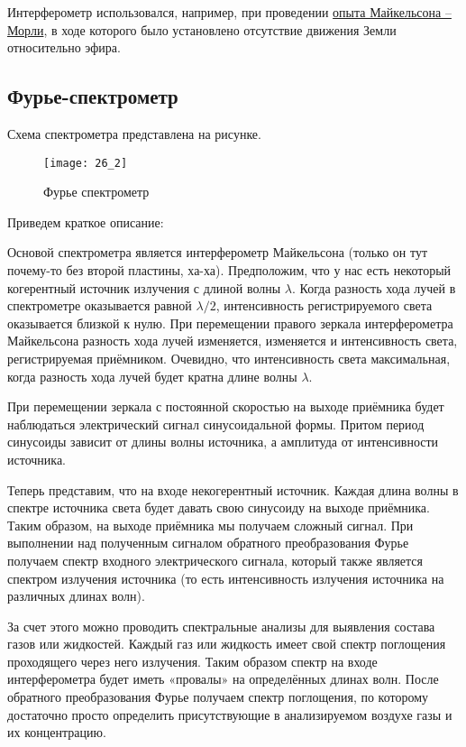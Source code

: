 Интерферометр использовался, например, при проведении  \href{https://elementy.ru/trefil/21167/Opyt_MaykelsonaMorli}{опыта Майкельсона -- Морли}, в ходе которого было установлено отсутствие движения Земли относительно эфира.

\subsection{Фурье-спектрометр}

Схема спектрометра представлена на рисунке. 

\begin{figure}[H]
	\centering
	\texttt{[image: 26\_2]}
	\caption{Фурье спектрометр}
\end{figure}

Приведем краткое описание:

Основой спектрометра является интерферометр Майкельсона (только он тут почему-то без второй пластины, ха-ха). Предположим, что у нас есть некоторый когерентный источник излучения с длиной волны $\lambda$. Когда разность хода лучей в спектрометре оказывается равной $\lambda/2$, интенсивность регистрируемого света оказывается близкой к нулю. При перемещении правого зеркала интерферометра Майкельсона разность хода лучей изменяется, изменяется и интенсивность света, регистрируемая приёмником. Очевидно, что интенсивность света максимальная, когда разность хода лучей будет кратна длине волны $\lambda$.

При перемещении зеркала с постоянной скоростью на выходе приёмника будет наблюдаться электрический сигнал синусоидальной формы. Притом период синусоиды зависит от длины волны источника, а амплитуда от интенсивности источника.

Теперь представим, что на входе некогерентный источник. Каждая длина волны в спектре источника света будет давать свою синусоиду на выходе приёмника. Таким образом, на выходе приёмника мы получаем сложный сигнал. При выполнении над полученным сигналом обратного преобразования Фурье получаем спектр входного электрического сигнала, который также является спектром излучения источника (то есть интенсивность излучения источника на различных длинах волн).

За счет этого можно проводить спектральные анализы для выявления состава газов или жидкостей. Каждый газ или жидкость имеет свой спектр поглощения проходящего через него излучения. Таким образом спектр на входе интерферометра будет иметь «провалы» на определённых длинах волн. После обратного преобразования Фурье получаем спектр поглощения, по которому достаточно просто определить присутствующие в анализируемом воздухе газы и их концентрацию.

